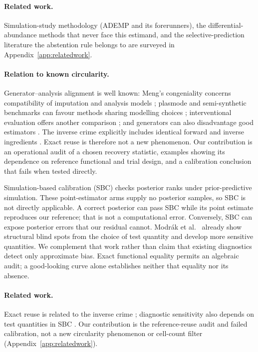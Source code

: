 \iffull
\paragraph{Related work.} Simulation-study methodology (ADEMP and its
forerunners), the differential-abundance methods that never face this
estimand, and the selective-prediction literature the abstention rule belongs
to are surveyed in Appendix~\ref{app:relatedwork}.

\paragraph{Relation to known circularity.} Generator--analysis alignment is
well known: Meng's congeniality concerns compatibility of imputation and
analysis models \citep{meng1994}; plasmode and semi-synthetic benchmarks can
favour methods sharing modelling choices \citep{franklin2014,curth2021};
interventional evaluation offers another comparison \citep{gentzel2019}; and
generators can also disadvantage good estimators \citep{shaw2026}. The inverse
crime explicitly includes identical forward and inverse ingredients
\citep{wirgin2004,kaipio2007}. Exact reuse is therefore not a new phenomenon.
Our contribution is an operational audit of a chosen recovery statistic,
examples showing its dependence on reference functional and trial design, and
a calibration conclusion that fails when tested directly.

Simulation-based calibration (SBC) \citep{talts2018} checks posterior ranks under
prior-predictive simulation. These point-estimator arms supply no posterior
samples, so SBC is not directly applicable. A correct posterior can pass SBC
while its point estimate reproduces our reference; that is not a computational
error. Conversely, SBC can expose posterior errors that our residual cannot.
Modr\'ak et al.~\citep{modrak2025} already show structural blind spots from the
choice of test quantity and develop more sensitive quantities. We complement
that work rather than claim that existing diagnostics detect only approximate
bias. Exact functional equality permits an algebraic audit; a good-looking
curve alone establishes neither that equality nor its absence.

\else
\paragraph{Related work.} Exact reuse is related to the inverse crime
\citep{wirgin2004}; diagnostic sensitivity also depends on test quantities in
SBC \citep{modrak2025}. Our contribution is the reference-reuse audit and failed
calibration, not a new circularity phenomenon or cell-count filter
(Appendix~\ref{app:relatedwork}).
\fi

